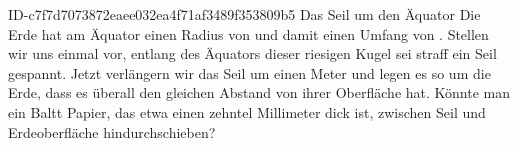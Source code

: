 \begin{exercise}
      {ID-c7f7d7073872eaee032ea4f71af3489f353809b5}
      {Das Seil um den Äquator}
  \ifproblem\problem
    Die Erde hat am Äquator einen Radius von  und damit einen
    Umfang von . Stellen wir uns einmal vor,
    entlang des Äquators dieser riesigen Kugel sei straff ein Seil gespannt.
    Jetzt verlängern wir das Seil um einen Meter und legen es so um die Erde,
    dass es überall den gleichen Abstand von ihrer Oberfläche hat.
    Könnte man ein Baltt Papier, das etwa einen zehntel Millimeter dick ist,
    zwischen Seil und Erdeoberfläche hindurchschieben?
  \fi
\end{exercise}
